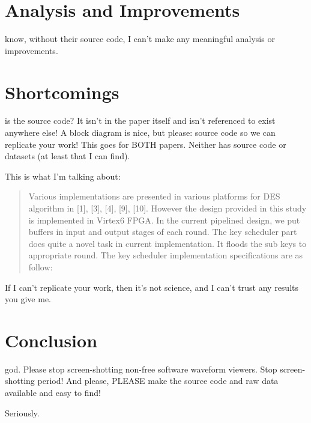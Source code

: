 \documentclass[journal,twocolumn]{IEEEtran}
\begin{document}
\section{Analysis and Improvements}

 know, without their source code, I can't make any
meaningful analysis or improvements.

\section{Shortcomings}

 is the source code? It isn't in the paper itself and
isn't referenced to exist anywhere else! A block diagram is nice, but please:
source code so we can replicate your work! This goes for BOTH papers. Neither 
has source code or datasets (at least that I can find).

This is what I'm talking about:

\begin{quote}
Various implementations are presented in various
platforms for DES algorithm in [1], [3], [4], [9], [10].
However the design provided in this study is implemented
in Virtex6 FPGA. In the current pipelined design, we put
buffers in input and output stages of each round. The key
scheduler part does quite a novel task in current
implementation. It floods the sub keys to appropriate round.
The key scheduler implementation specifications are as
follow: 
\end{quote}

If I can't replicate your work, then it's not science, and I can't trust 
any results you give me.

\section{Conclusion}

 god. Please stop screen-shotting non-free software
waveform viewers. Stop screen-shotting period! And please, PLEASE make the
source code and raw data available and easy to find!

Seriously.



\end{document}
